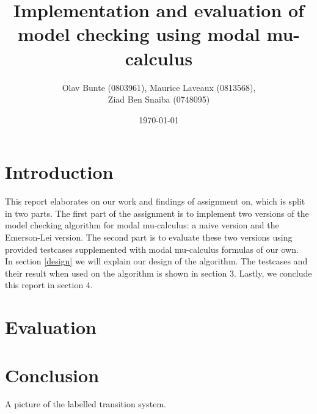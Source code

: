 \documentclass[10pt,a4paper]{article}
\title{Implementation and evaluation of model checking using modal mu-calculus}
\author{Olav Bunte (0803961), Maurice Laveaux (0813568),\\ Ziad Ben Snaiba (0748095)}
\date{\today}
\begin{document}
\maketitle

\section{Introduction}
This report elaborates on our work and findings of assignment on, which is split in two parts. The first part of the assignment is to implement two versions of the model checking algorithm for modal mu-calculus: a naive version and the Emerson-Lei version. The second part is to evaluate these two versions using provided testcases supplemented with modal mu-calculus formulas of our own.\\
In section \ref{design} we will explain our design of the algorithm. The testcases and their result when used on the algorithm is shown in section 3. Lastly, we conclude this report in section 4.



\section{Evaluation}







\section{Conclusion}


A picture of the labelled transition system.

\end{document}
